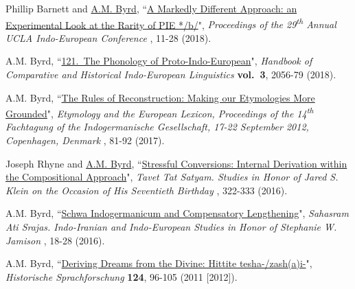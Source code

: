 \documentclass[paper=letter,fontsize=11pt]{scrartcl} %
\newcommand{\PaperEntry}[7]{
		\noindent #1, ``\href{#7}{#2}", \textit{#3} \textbf{#4}, #5 (#6).}
\begin{document}
\begin{etaremune}
\item \PaperEntry{Phillip Barnett and \underline{A.M. Byrd}}{A Markedly Different Approach: an Experimental Look at the Rarity of PIE */b/}{Proceedings of the 29\textsuperscript{th} Annual UCLA Indo-European Conference}{\hspace{-.35em}}{11-28}{2018}{http://box2018.temp.domains/~speakjb5/wp-content/uploads/2018/03/Barnett-Byrd-A-Markedly-Different-Approach.pdf}

\item \PaperEntry{A.M. Byrd}{121.~The Phonology of Proto-Indo-European}{Handbook of Comparative and Historical Indo-European Linguistics}{vol.~3}{2056-79}{2018}{https://www.degruyter.com/view/product/487972} 

\item \PaperEntry{A.M. Byrd}{The Rules of Reconstruction: Making our Etymologies More Grounded}{Etymology and the European Lexicon, Proceedings of the 14\textsuperscript{th} Fachtagung of the Indogermanische Gesellschaft, 17-22 September 2012, Copenhagen, Denmark}{\hspace{-.35em}}{81-92}{2017}{https://reichert-verlag.de/buchreihen/sprachwissenschaft_reihen/sprachwissenschaft_akten_der_fachtagung_der_indogermanischen_gesellschaft/9783954902026_etymology_and_the_european_lexicon-detail} 

\item \PaperEntry{Joseph Rhyne and \underline{A.M. Byrd}}{Stressful Conversions: Internal Derivation within the Compositional Approach}{Tavet Tat Satyam. Studies in Honor of Jared S. Klein on the Occasion of His Seventieth Birthday}{\hspace{-.35em}}{322-333}{2016}{http://www.beechstave.com/tavet.htm}

\item \PaperEntry{A.M. Byrd}{Schwa Indogermanicum and Compensatory Lengthening}{Sahasram Ati Srajas. Indo-Iranian and Indo-European Studies in Honor of Stephanie W. Jamison}{\hspace{-.35em}}{18-28}{2016}{http://www.beechstave.com/sahas.htm}

\item \PaperEntry{A.M. Byrd}{Deriving Dreams from the Divine: Hittite tesha-/zash(a)i-}{Historische Sprachforschung}{124}{96-105}{2011 [2012]}{http://rootsofeurope.ku.dk/english/activities/sound_of_indo-european/}


\end{etaremune}
\end{document}
